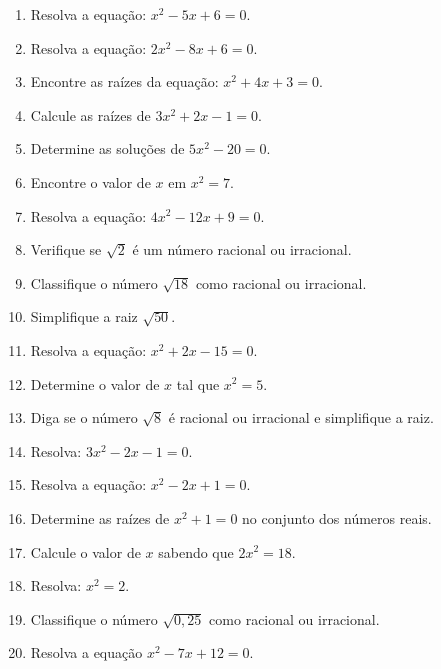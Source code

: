 \documentclass[12pt,a4paper]{article}
\begin{document}
\begin{enumerate}

\item Resolva a equa\c{c}\~ao: $x^2 - 5x + 6 = 0$.

\item Resolva a equa\c{c}\~ao: $2x^2 - 8x + 6 = 0$.

\item Encontre as ra\'izes da equa\c{c}\~ao: $x^2 + 4x + 3 = 0$.

\item Calcule as ra\'izes de $3x^2 + 2x - 1 = 0$.

\item Determine as solu\c{c}\~oes de $5x^2 - 20 = 0$.

\item Encontre o valor de $x$ em $x^2 = 7$.

\item Resolva a equa\c{c}\~ao: $4x^2 - 12x + 9 = 0$.

\item Verifique se $\sqrt{2}$ \'e um n\'umero racional ou irracional.

\item Classifique o n\'umero $\sqrt{18}$ como racional ou irracional.

\item Simplifique a raiz $\sqrt{50}$.

\item Resolva a equa\c{c}\~ao: $x^2 + 2x - 15 = 0$.

\item Determine o valor de $x$ tal que $x^2 = 5$.

\item Diga se o n\'umero $\sqrt{8}$ \'{e} racional ou irracional e simplifique a raiz.

\item Resolva: $3x^2 - 2x - 1 = 0$.

\item Resolva a equa\c{c}\~ao: $x^2 - 2x + 1 = 0$.

\item Determine as ra\'izes de $x^2 + 1 = 0$ no conjunto dos n\'umeros reais.

\item Calcule o valor de $x$ sabendo que $2x^2 = 18$.

\item Resolva: $x^2 = 2$.

\item Classifique o n\'umero $\sqrt{0,25}$ como racional ou irracional.

\item Resolva a equa\c{c}\~ao $x^2 - 7x + 12 = 0$.

\end{enumerate}
\end{document}
